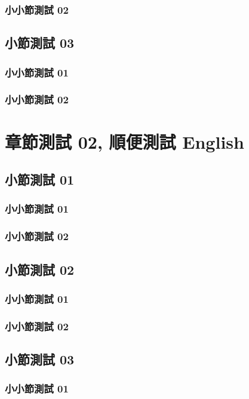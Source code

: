     \subsection{小小節測試 02}
    \lipsum[23]
    \section{小節測試 03}
    \lipsum[23]
    \subsection{小小節測試 01}
    \lipsum[23]
    \subsection{小小節測試 02}
    \lipsum[23]

\chapter{章節測試 02, 順便測試 English}
    \section{小節測試 01}
    \lipsum[23]
    \subsection{小小節測試 01}
    \lipsum[23]
    \subsection{小小節測試 02}
    \lipsum[23]
    \section{小節測試 02}
    \lipsum[23]
    \subsection{小小節測試 01}
    \lipsum[23]
    \subsection{小小節測試 02}
    \lipsum[23]
    \section{小節測試 03}
    \lipsum[23]
    \subsection{小小節測試 01}
    \lipsum[23]
